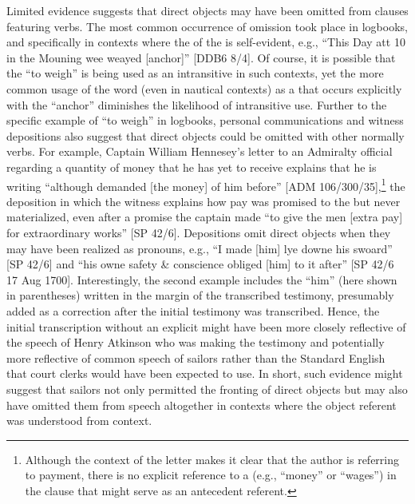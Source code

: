 Limited evidence suggests that direct objects may have been omitted from clauses featuring  verbs. The most common occurrence of  omission took place in logbooks, and specifically in contexts where the  of the  is self-evident, e.g., “This Day att 10 in the Mouning wee weayed [anchor]” [DDB6 8/4]. Of course, it is possible that the  “to weigh” is being used as an intransitive  in such contexts, yet the more common usage of the word (even in nautical contexts) as a  that occurs explicitly with the  “anchor” diminishes the likelihood of intransitive use. Further to the specific example of “to weigh” in logbooks, personal communications and witness depositions also suggest that direct objects could be omitted with other normally  verbs. For example, Captain William Hennesey’s letter to an Admiralty official regarding a quantity of money that he has yet to receive explains that he is writing “although demanded [the money] of him before” [ADM 106/300/35],\footnote{Although the context of the letter makes it clear that the author is referring to payment, there is no explicit reference to a  (e.g., “money” or “wages”) in the clause that might serve as an antecedent referent.}  the deposition in which the witness explains how pay was promised to the  but never materialized, even after a promise the captain made “to give the men [extra pay] for extraordinary works” [SP 42/6]. Depositions omit direct objects when they may have been realized as pronouns, e.g., “I made [him] lye downe his swoard” [SP 42/6] and “his owne safety \& conscience obliged [him] to it after” [SP 42/6 17 Aug {1700}]. Interestingly, the second example includes the  “him” (here shown in parentheses) written in the margin of the transcribed testimony, presumably added as a correction after the initial testimony was transcribed. Hence, the initial transcription without an explicit  might have been more closely reflective of the speech of Henry Atkinson who was making the testimony and potentially more reflective of common speech of sailors rather than the Standard English that court clerks would have been expected to use. In short, such evidence might suggest that sailors not only permitted the fronting of direct objects but may also have omitted them from speech altogether in contexts where the object referent was understood from context.  


